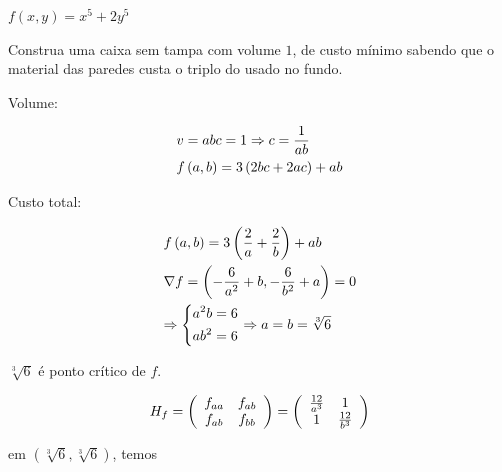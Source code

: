 \documentclass[11pt, oneside, a4paper]{gsm-l}
\begin{document}
\begin{exem}
$f\left( {x,y} \right) = x^5  + 2y^5$
\end{exem}

\begin{exem}
    Construa uma caixa sem tampa com volume $1$, de custo mínimo sabendo que o material das paredes custa o triplo do usado no fundo.
\end{exem}

\begin{sol}

Volume:

\[
\begin{gathered}
v = abc = 1 \Rightarrow c = \frac{1}
{{ab}} \hfill \\
f\left( {a,b} \right) = 3\left( {2bc + 2ac} \right) + ab \hfill \\
\end{gathered}
\]

Custo total:

\[
\begin{gathered}
f\left( {a,b} \right) = 3\left( {\frac{2}
a + \frac{2}
{b}} \right) + ab \hfill \\
\nabla f = \left( { - \frac{6}
{{a^2 }} + b, - \frac{6}
{{b^2 }} + a} \right) = 0 \hfill \\
\Rightarrow \left\{ \begin{gathered}
a^2 b = 6 \hfill \\
ab^2  = 6 \hfill \\
\end{gathered}  \right. \Rightarrow a = b = \sqrt[3]{6} \hfill \\
\end{gathered}
\]

$\sqrt[3]{6}$ é ponto crítico de $f$.

\[
H_f  = \left( {\begin{array}{*{20}c}
{f_{aa} } & {f_{ab} }  \\
{f_{ab} } & {f_{bb} }  \\

\end{array} } \right) = \left( {\begin{array}{*{20}c}
{\tfrac{{12}}
{{a^3 }}} & 1  \\
1 & {\tfrac{{12}}
{{b^3 }}}  \\

\end{array} } \right)
\]

em $\left( {\sqrt[3]{6},\sqrt[3]{6}} \right)$, temos


\end{sol}
\end{document}
